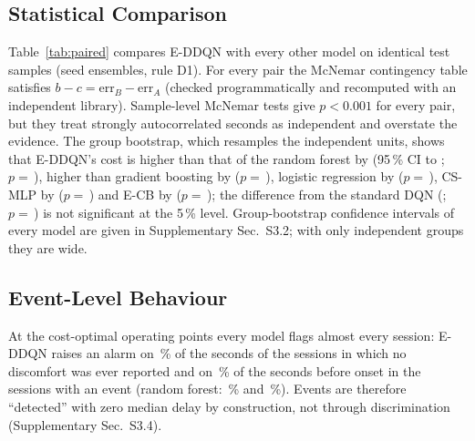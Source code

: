 \begin{table}[t]
\centering
\caption{Matched operating points: thresholds chosen on validation predictions to reach the stated recall or specificity; test recall (\%), false-positive rate (\%) and false-positive count of the seed ensemble.}
\label{tab:matched}
\resizebox{\textwidth}{!}{}
\end{table}

\subsection{Statistical Comparison}
\label{sec:stats}
Table~\ref{tab:paired} compares E-DDQN with every other model on identical test samples (seed ensembles, rule D1). For every pair the McNemar contingency table satisfies $b-c=\mathrm{err}_B-\mathrm{err}_A$ (checked programmatically and recomputed with an independent library). Sample-level McNemar tests give $p<0.001$ for every pair, but they treat \nSamplesEval{} strongly autocorrelated seconds as independent and overstate the evidence. The group bootstrap, which resamples the \nGroupsEval{} independent units, shows that E-DDQN's cost is higher than that of the random forest by \PairDOneRFCostDiff{} (95\,\% CI \PairDOneRFCostLo{} to \PairDOneRFCostHi; $p=$\,\PairDOneRFPboot), higher than gradient boosting by \PairDOneHGBCostDiff{} ($p=$\,\PairDOneHGBPboot), logistic regression by \PairDOneLRCostDiff{} ($p=$\,\PairDOneLRPboot), CS-MLP by \PairDOneCSMLPCostDiff{} ($p=$\,\PairDOneCSMLPPboot) and E-CB by \PairDOneECBCostDiff{} ($p=$\,\PairDOneECBPboot); the difference from the standard DQN (\PairDOneDQNCostDiff; $p=$\,\PairDOneDQNPboot) is not significant at the 5\,\% level. Group-bootstrap confidence intervals of every model are given in Supplementary Sec.~S3.2; with only \nGroupsEval{} independent groups they are wide.

\begin{table}[t]
\centering
\caption{Paired comparisons with E-DDQN (A) on the same \nSamplesEval{} test samples (seed ensembles, rule D1). $b$: A correct, B wrong; $c$: A wrong, B correct. $\Delta$Cost and its CI and $p_{\text{group}}$ come from 2,000 group-bootstrap replicates; $p_{\text{exact}}$ is the sample-level exact McNemar test.}
\label{tab:paired}
\resizebox{\textwidth}{!}{}
\end{table}

\subsection{Event-Level Behaviour}
At the cost-optimal operating points every model flags almost every session: E-DDQN raises an alarm on \EDDQNEvFreeAlarm\,\% of the seconds of the \nEventFreeSessions{} sessions in which no discomfort was ever reported and on \EDDQNEvPreAlarm\,\% of the seconds before onset in the \nEventSessions{} sessions with an event (random forest: \RFEvFreeAlarm\,\% and \RFEvPreAlarm\,\%). Events are therefore ``detected'' with zero median delay by construction, not through discrimination (Supplementary Sec.~S3.4).

